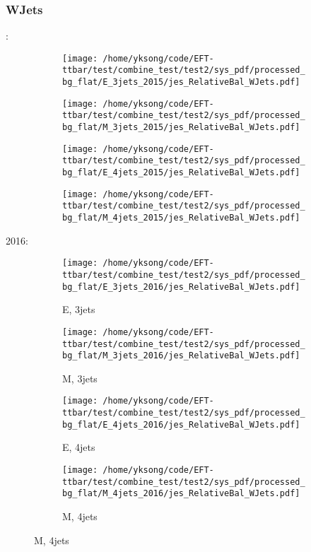 \documentclass{beamer}
\begin{document}
\begin{frame}
\frametitle{WJets}
\fontsize{5}{1}:
\begin{figure}
\centering
\begin{subfigure}[b]{0.24\textwidth}
\texttt{[image: /home/yksong/code/EFT-ttbar/test/combine\_test/test2/sys\_pdf/processed\_bg\_flat/E\_3jets\_2015/jes\_RelativeBal\_WJets.pdf]}
\end{subfigure}
\begin{subfigure}[b]{0.24\textwidth}
\texttt{[image: /home/yksong/code/EFT-ttbar/test/combine\_test/test2/sys\_pdf/processed\_bg\_flat/M\_3jets\_2015/jes\_RelativeBal\_WJets.pdf]}
\end{subfigure}
\begin{subfigure}[b]{0.24\textwidth}
\texttt{[image: /home/yksong/code/EFT-ttbar/test/combine\_test/test2/sys\_pdf/processed\_bg\_flat/E\_4jets\_2015/jes\_RelativeBal\_WJets.pdf]}
\end{subfigure}
\begin{subfigure}[b]{0.24\textwidth}
\texttt{[image: /home/yksong/code/EFT-ttbar/test/combine\_test/test2/sys\_pdf/processed\_bg\_flat/M\_4jets\_2015/jes\_RelativeBal\_WJets.pdf]}
\end{subfigure}
\end{figure}
2016:
\begin{figure}
\centering
\begin{subfigure}[b]{0.24\textwidth}
\texttt{[image: /home/yksong/code/EFT-ttbar/test/combine\_test/test2/sys\_pdf/processed\_bg\_flat/E\_3jets\_2016/jes\_RelativeBal\_WJets.pdf]}
\captionsetup{font=tiny}
\caption{E, 3jets}
\end{subfigure}
\begin{subfigure}[b]{0.24\textwidth}
\texttt{[image: /home/yksong/code/EFT-ttbar/test/combine\_test/test2/sys\_pdf/processed\_bg\_flat/M\_3jets\_2016/jes\_RelativeBal\_WJets.pdf]}
\captionsetup{font=tiny}
\caption{M, 3jets}
\end{subfigure}
\begin{subfigure}[b]{0.24\textwidth}
\texttt{[image: /home/yksong/code/EFT-ttbar/test/combine\_test/test2/sys\_pdf/processed\_bg\_flat/E\_4jets\_2016/jes\_RelativeBal\_WJets.pdf]}
\captionsetup{font=tiny}
\caption{E, 4jets}
\end{subfigure}
\begin{subfigure}[b]{0.24\textwidth}
\texttt{[image: /home/yksong/code/EFT-ttbar/test/combine\_test/test2/sys\_pdf/processed\_bg\_flat/M\_4jets\_2016/jes\_RelativeBal\_WJets.pdf]}
\captionsetup{font=tiny}
\caption{M, 4jets}
\end{subfigure}
\end{figure}
\end{frame}
\end{document}
